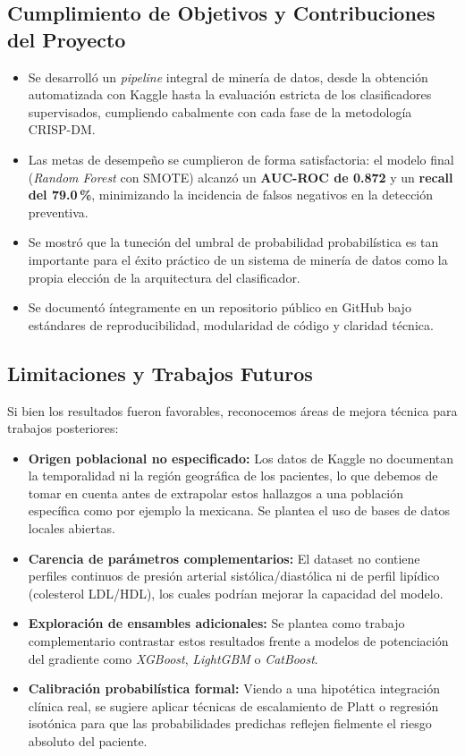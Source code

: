 \documentclass[12pt,a4paper]{article}
\begin{document}
\subsection{Cumplimiento de Objetivos y Contribuciones del Proyecto}
\begin{itemize}[leftmargin=1.2cm, itemsep=0.3em]
    \item Se desarrolló un \textit{pipeline} integral de minería de datos, desde la obtención automatizada con Kaggle hasta la evaluación estricta de los clasificadores supervisados, cumpliendo cabalmente con cada fase de la metodología CRISP-DM.
    \item Las metas de desempeño se cumplieron de forma satisfactoria: el modelo final (\textit{Random Forest} con SMOTE) alcanzó un \textbf{AUC-ROC de 0.872} y un \textbf{recall del 79.0\,\%}, minimizando la incidencia de falsos negativos en la detección preventiva.
    \item Se mostró que la tuneción del umbral de probabilidad probabilística es tan importante para el éxito práctico de un sistema de minería de datos como la propia elección de la arquitectura del clasificador.
    \item Se documentó íntegramente en un repositorio público en GitHub bajo estándares de reproducibilidad, modularidad de código y claridad técnica.
\end{itemize}

\subsection{Limitaciones y Trabajos Futuros}
Si bien los resultados fueron favorables, reconocemos áreas de mejora técnica para trabajos posteriores:
\begin{itemize}[itemsep=0.3em, leftmargin=1.2cm]
    \item \textbf{Origen poblacional no especificado:} Los datos de Kaggle no documentan la temporalidad ni la región geográfica de los pacientes, lo que debemos de tomar en cuenta antes de extrapolar estos hallazgos a una población específica como por ejemplo la mexicana. Se plantea el uso de bases de datos locales abiertas.
    \item \textbf{Carencia de parámetros complementarios:} El dataset no contiene perfiles continuos de presión arterial sistólica/diastólica ni de perfil lipídico (colesterol LDL/HDL), los cuales podrían mejorar la capacidad del modelo.
    \item \textbf{Exploración de ensambles adicionales:} Se plantea como trabajo complementario contrastar estos resultados frente a modelos de potenciación del gradiente como \textit{XGBoost}, \textit{LightGBM} o \textit{CatBoost}.
    \item \textbf{Calibración probabilística formal:} Viendo a una hipotética integración clínica real, se sugiere aplicar técnicas de escalamiento de Platt o regresión isotónica para que las probabilidades predichas reflejen fielmente el riesgo absoluto del paciente.
\end{itemize}
\end{document}
